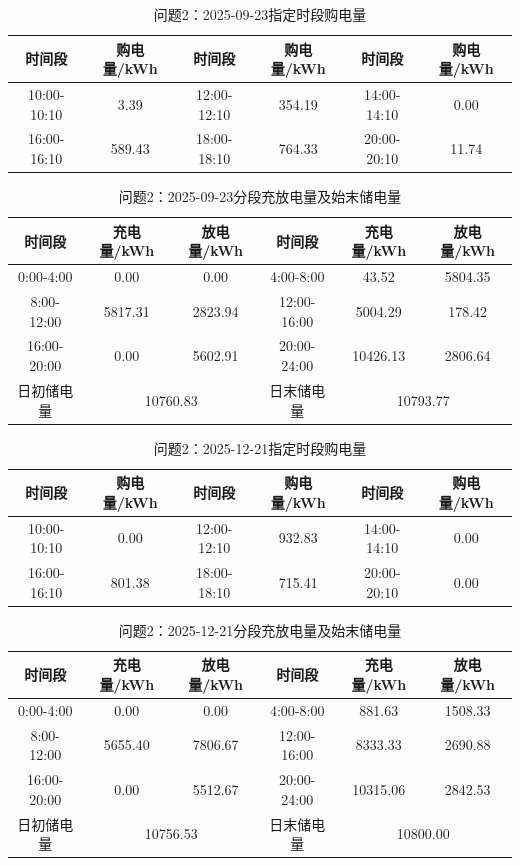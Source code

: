 \begin{table}[H]\centering\scriptsize
\caption{问题2：2025-09-23指定时段购电量}
\begin{tabular}{cc|cc|cc}\toprule
时间段&购电量/kWh&时间段&购电量/kWh&时间段&购电量/kWh\\\midrule
10:00-10:10 & 3.39 & 12:00-12:10 & 354.19 & 14:00-14:10 & 0.00 \\
16:00-16:10 & 589.43 & 18:00-18:10 & 764.33 & 20:00-20:10 & 11.74 \\
\bottomrule\end{tabular}\end{table}
\begin{table}[H]\centering\scriptsize
\caption{问题2：2025-09-23分段充放电量及始末储电量}
\begin{tabular}{ccc|ccc}\toprule
时间段&充电量/kWh&放电量/kWh&时间段&充电量/kWh&放电量/kWh\\\midrule
0:00-4:00 & 0.00 & 0.00 & 4:00-8:00 & 43.52 & 5804.35 \\
8:00-12:00 & 5817.31 & 2823.94 & 12:00-16:00 & 5004.29 & 178.42 \\
16:00-20:00 & 0.00 & 5602.91 & 20:00-24:00 & 10426.13 & 2806.64 \\
\midrule 日初储电量&\multicolumn{2}{c|}{10760.83}&日末储电量&\multicolumn{2}{c}{10793.77}\\\bottomrule\end{tabular}\end{table}
\begin{table}[H]\centering\scriptsize
\caption{问题2：2025-12-21指定时段购电量}
\begin{tabular}{cc|cc|cc}\toprule
时间段&购电量/kWh&时间段&购电量/kWh&时间段&购电量/kWh\\\midrule
10:00-10:10 & 0.00 & 12:00-12:10 & 932.83 & 14:00-14:10 & 0.00 \\
16:00-16:10 & 801.38 & 18:00-18:10 & 715.41 & 20:00-20:10 & 0.00 \\
\bottomrule\end{tabular}\end{table}
\begin{table}[H]\centering\scriptsize
\caption{问题2：2025-12-21分段充放电量及始末储电量}
\begin{tabular}{ccc|ccc}\toprule
时间段&充电量/kWh&放电量/kWh&时间段&充电量/kWh&放电量/kWh\\\midrule
0:00-4:00 & 0.00 & 0.00 & 4:00-8:00 & 881.63 & 1508.33 \\
8:00-12:00 & 5655.40 & 7806.67 & 12:00-16:00 & 8333.33 & 2690.88 \\
16:00-20:00 & 0.00 & 5512.67 & 20:00-24:00 & 10315.06 & 2842.53 \\
\midrule 日初储电量&\multicolumn{2}{c|}{10756.53}&日末储电量&\multicolumn{2}{c}{10800.00}\\\bottomrule\end{tabular}\end{table}
